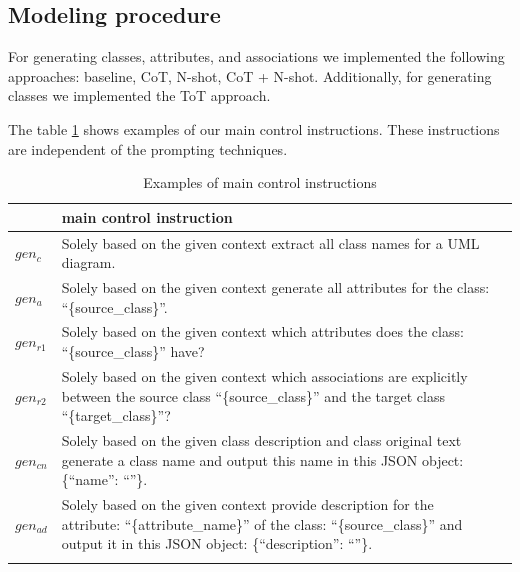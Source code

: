 \subsection{Modeling procedure}

For generating classes, attributes, and associations we implemented the following approaches: baseline, CoT, N-shot, CoT + N-shot. Additionally, for generating classes we implemented the ToT approach.

The table \ref{tab:main-control-instructions} shows examples of our main control instructions. These instructions are independent of the prompting techniques.

\begin{table}[!h]
    \scriptsize
    \centering
    \setlength{\tabcolsep}{0.5em}
\begin{tabular}{@{}l>{\raggedright\arraybackslash}p{}>{\raggedright\arraybackslash}p{}@{}}
         & main control instruction \\
    \toprule
    \addlinespace
    
$gen_c$ & Solely based on the given context extract all class names for a UML diagram. \\
\addlinespace

$gen_a$ & Solely based on the given context generate all attributes for the class: ``\{source\_class\}''. \\
\addlinespace

$gen_{r1}$ & Solely based on the given context which attributes does the class: ``\{source\_class\}'' have? \\
\addlinespace

$gen_{r2}$ & Solely based on the given context which associations are explicitly between the source class ``\{source\_class\}'' and the target class ``\{target\_class\}''? \\
\addlinespace

$gen_{cn}$ & Solely based on the given class description and class original text generate a class name and output this name in this JSON object: \{``name'': ``''\}. \\
\addlinespace

$gen_{ad}$ & Solely based on the given context provide description for the attribute: ``\{attribute\_name\}'' of the class: ``\{source\_class\}'' and output it in this JSON object: \{``description'': ``''\}. \\
\addlinespace

	\bottomrule
	\addlinespace
	\end{tabular}
	\caption{Examples of main control instructions}
	\label{tab:main-control-instructions}
\end{table}


